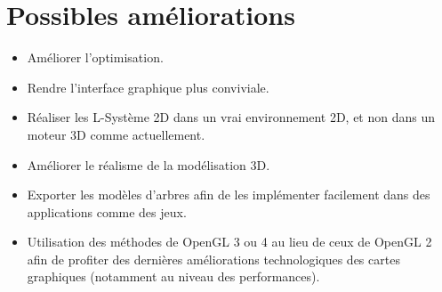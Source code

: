 \section{Possibles améliorations}

\begin{itemize}
    \item Améliorer l'optimisation.
    \item Rendre l'interface graphique plus conviviale.
    \item Réaliser les L-Système 2D dans un vrai environnement 2D, et non dans un moteur 3D comme actuellement.
    \item Améliorer le réalisme de la modélisation 3D.
    \item Exporter les modèles d'arbres afin de les implémenter facilement dans des applications comme des jeux.
    \item Utilisation des méthodes de OpenGL 3 ou 4 au lieu de ceux de OpenGL 2 afin de profiter des dernières améliorations technologiques des cartes graphiques (notamment au niveau des performances).
    
\end{itemize}
